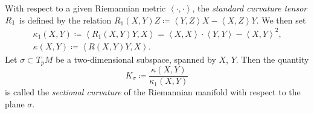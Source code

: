 \documentclass[../main.tex]{subfiles}
\begin{document}
\begin{definition}\label{SectionalCurvature}
    With respect to a given Riemannian metric \(\left\langle\cdot,\cdot\right\rangle\),
    the \textit{standard curvature tensor} \(\tensor{{R_1}}{}\) is defined by the relation
    \(R_1\left(X,Y\right)Z\coloneqq\left\langle Y,Z\right\rangle X-\left\langle X,Z\right\rangle Y\).
    We then set
    \begin{align*}
        \kappa_1\left(X,Y\right)
        \coloneqq\left\langle R_1\left(X,Y\right)Y,X\right\rangle
        =\left\langle X,X\right\rangle\cdot\left\langle Y,Y\right\rangle-\left\langle X,Y\right\rangle^2\text{,} \\
        \kappa\left(X,Y\right)
        \coloneqq\left\langle R\left(X,Y\right)Y,X\right\rangle\text{.}
    \end{align*}
    Let \(\sigma\subset T_pM\) be a two-dimensional subspace, spanned by \(X\), \(Y\).
    Then the quantity
    \[
        K_\sigma
        \coloneqq
        \frac{\kappa\left(X,Y\right)}{\kappa_1\left(X,Y\right)}
    \]
    is called the \textit{sectional curvature} of the Riemannian manifold with respect to the plane \(\sigma\).
\end{definition}
\end{document}
